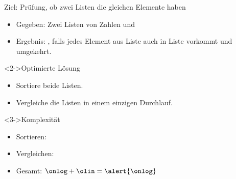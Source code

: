 \begin{frame}
    \begin{block}{Ziel: Prüfung, ob zwei Listen die gleichen Elemente haben}
        \begin{itemize}
            \item Gegeben: Zwei Listen von Zahlen  und 
            \item Ergebnis: , falls jedes Element aus Liste  auch in Liste  vorkommt und umgekehrt.
        \end{itemize}
    \end{block}
    \begin{block}<2->{Optimierte Lösung}
        \begin{itemize}
            \item Sortiere beide Listen.
            \item Vergleiche die Listen in einem einzigen Durchlauf.
        \end{itemize}
    \end{block}
    \begin{block}<3->{Komplexität}
        \begin{itemize}
            \item Sortieren: \onlog
            \item Vergleichen: \olin
            \item \alert{Gesamt}: $\onlog + \olin = \alert{\onlog}$
        \end{itemize}
    \end{block}
\end{frame}
